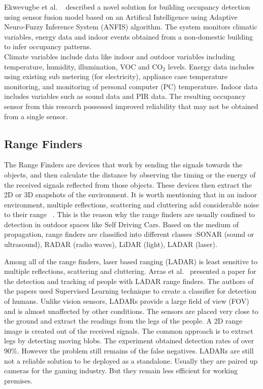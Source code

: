 Ekwevugbe et al.  ~\cite{ekwevugbe2012design} described a novel solution for building occupancy detection using sensor fusion model based on an Artifical Intelligence using Adaptive Neuro-Fuzzy Inference System (ANFIS) algorithm. The system monitors climatic variables, energy data and indoor events obtained from a non-domestic building to infer occupancy patterns.
\\
Climate variables include data like indoor and outdoor variables including temperature, humidity, illumination, VOC and CO$_{2}$ levels.
Energy data includes using existing sub metering
(for electricity), appliance case temperature monitoring, and monitoring of personal computer (PC) temperature.
Indoor data includes variables such as sound data and  PIR data. The resulting occupancy sensor from this research possessed improved reliability that may not be obtained from a single sensor. 

\subsection{Range Finders}
The Range Finders are devices that work by sending the signals towards the objects, and then calculate the distance by observing the timing or the energy of the received signals reflected from those objects. These devices then extract the 2D or 3D snapshots of the environment. It is worth mentioning that in an indoor environment, multiple reflections, scattering and cluttering add considerable noise to their range ~\cite{teixeira2010survey}. This is the reason why the range finders are usually confined to detection in outdoor spaces like Self Driving Cars. 
Based on the medium of propagation, range finders are classified into different classes :SONAR (sound or ultrasound),  RADAR (radio waves), LiDAR
(light), LADAR (laser).

Among all of the range finders, laser based ranging (LADAR) is least sensitive to multiple reflections, scattering and cluttering. Arras et al.~\cite{arras2007using} presented a paper for the detection and tracking of people with LADAR range finders. The authors of the papers used Supervised Learning technique to create a classifier for detection of humans. Unlike vision sensors, LADARs provide a large field of view (FOV) and is almost unaffected by other conditions. The sensors are placed very close to the ground and extract the readings from the legs of the people. A 2D range image is created out of the received signals. The common approach is to extract legs by detecting moving blobs. The experiment obtained detection rates of over 90\%. However the problem still remains of the false negatives. LADARs are still not a reliable solution to be deployed as a standalone. Usually they are paired up cameras for the gaming industry. But they remain less efficient for working premises.
\\

